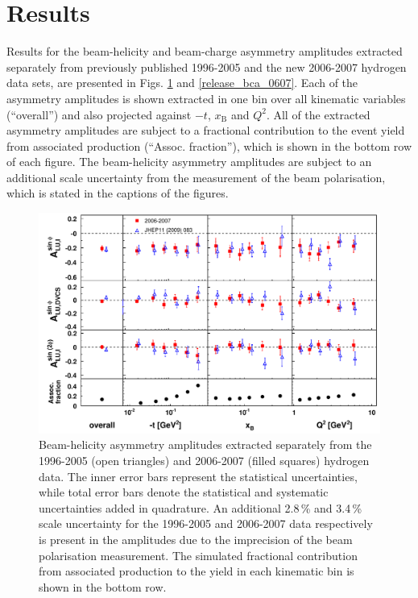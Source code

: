 \section{Results}
Results for the beam-helicity and beam-charge asymmetry amplitudes extracted separately from previously published 1996-2005 and the new 2006-2007 hydrogen data sets, are presented in Figs. \ref{release_bsa_0607} and \ref{release_bca_0607}. Each of the asymmetry amplitudes is shown extracted in one bin over all kinematic variables (``overall'') and also projected against $-t$, $x_{\textrm{B}}$ and $Q^{2}$. All of the extracted asymmetry amplitudes are subject to a fractional contribution to the event yield from associated production (``Assoc. fraction''), which is shown in the bottom row of each figure. The beam-helicity asymmetry amplitudes are subject to an additional scale uncertainty from the measurement of the beam polarisation, which is stated in the captions of the figures.
\begin{figure}
\begin{center}
\includegraphics[width=15cm,keepaspectratio]{bsadvcsplots_eml_par13_bin6_release_pic_update_0607_9605}
  \caption{Beam-helicity asymmetry amplitudes extracted separately from
the 1996-2005 (open triangles) and 2006-2007 (filled squares)
hydrogen data. The inner error bars represent the statistical uncertainties, while total error bars denote the statistical and systematic uncertainties added in quadrature.  
An additional 2.8\,\% and 3.4\,\% scale uncertainty for the 1996-2005 and
2006-2007 data respectively is present in the amplitudes due to the imprecision of
the beam polarisation measurement. The simulated fractional contribution from associated production to the yield in each kinematic bin is shown in the bottom row.}
 \label{release_bsa_0607}
\end{center}
 \end{figure}

